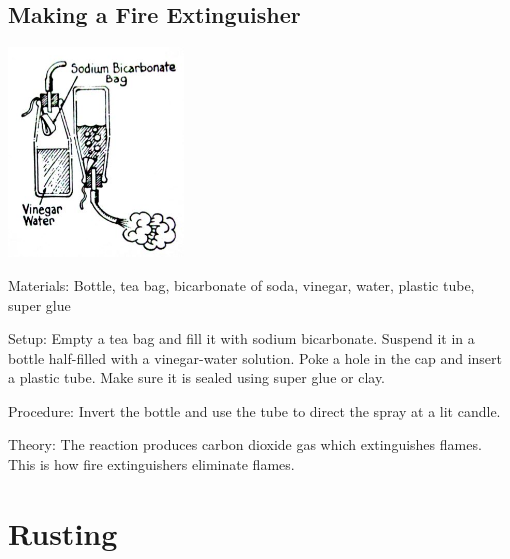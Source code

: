 \begin{multicols}{2}
\vfill
\columnbreak

\subsection{Making a Fire Extinguisher}

\begin{center}
\includegraphics[width=0.35\textwidth]{./img/fire-extinguisher.jpg}
\end{center}

\begin{description*}
\item[Materials:]{Bottle, tea bag, bicarbonate of soda, vinegar, water, plastic tube, super glue}
\item[Setup:]{Empty a tea bag and fill it with sodium bicarbonate. Suspend it in a bottle half-filled with a vinegar-water solution. Poke a hole in the cap and insert a plastic tube. Make sure it is sealed using super glue or clay.}
\item[Procedure:]{Invert the bottle and use the tube to direct the spray at a lit candle.}
\item[Theory:]{The reaction produces carbon dioxide gas which extinguishes flames. This is how fire extinguishers eliminate flames.}
\end{description*}

\vfill
\columnbreak


\section*{Rusting} 



\end{multicols}
